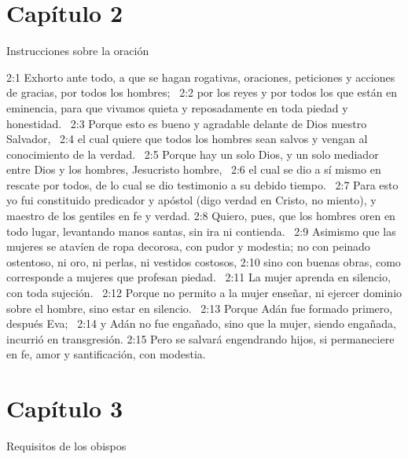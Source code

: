 \section*{Capítulo 2 }
Instrucciones sobre la oración  

2:1 Exhorto ante todo, a que se hagan rogativas, oraciones, peticiones y acciones de gracias, por todos los hombres;  
2:2 por los reyes y por todos los que están en eminencia, para que vivamos quieta y reposadamente en toda piedad y honestidad.  
2:3 Porque esto es bueno y agradable delante de Dios nuestro Salvador,  
2:4 el cual quiere que todos los hombres sean salvos y vengan al conocimiento de la verdad.  
2:5 Porque hay un solo Dios, y un solo mediador entre Dios y los hombres, Jesucristo hombre,  
2:6 el cual se dio a sí mismo en rescate por todos, de lo cual se dio testimonio a su debido tiempo.  
2:7 Para esto yo fui constituido predicador y apóstol (digo verdad en Cristo, no miento), y maestro de los gentiles en fe y verdad. 
2:8 Quiero, pues, que los hombres oren en todo lugar, levantando manos santas, sin ira ni contienda.  
2:9 Asimismo que las mujeres se atavíen de ropa decorosa, con pudor y modestia; no con peinado ostentoso, ni oro, ni perlas, ni vestidos costosos, 
2:10 sino con buenas obras, como corresponde a mujeres que profesan piedad.  
2:11 La mujer aprenda en silencio, con toda sujeción.  
2:12 Porque no permito a la mujer enseñar, ni ejercer dominio sobre el hombre, sino estar en silencio.  
2:13 Porque Adán fue formado primero, después Eva;  
2:14 y Adán no fue engañado, sino que la mujer, siendo engañada, incurrió en transgresión. 
2:15 Pero se salvará engendrando hijos, si permaneciere en fe, amor y santificación, con modestia.  
\section*{Capítulo 3}
Requisitos de los obispos  

